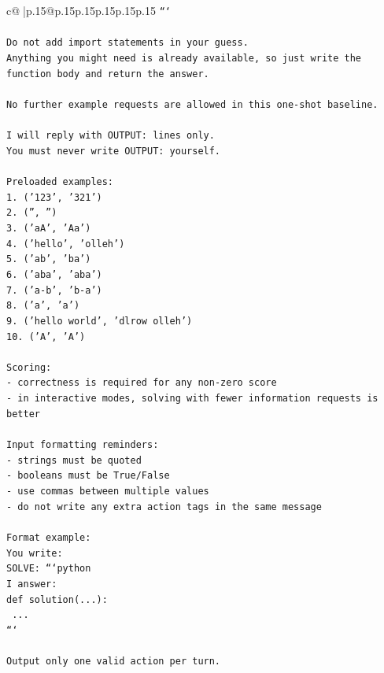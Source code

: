 \documentclass{article}
\begin{document}
{\begin{supertabular}{c@{$\;$}|p{.15\linewidth}@{}p{.15\linewidth}p{.15\linewidth}p{.15\linewidth}p{.15\linewidth}p{.15\linewidth}}
{{{\texttt{```} \\
\\ 
\texttt{Do not add import statements in your guess.} \\
\texttt{Anything you might need is already available, so just write the function body and return the answer.} \\
\\ 
\texttt{No further example requests are allowed in this one{-}shot baseline.} \\
\\ 
\texttt{I will reply with OUTPUT: lines only.} \\
\texttt{You must never write OUTPUT: yourself.} \\
\\ 
\texttt{Preloaded examples:} \\
\texttt{1. ('123', '321')} \\
\texttt{2. ('', '')} \\
\texttt{3. ('aA', 'Aa')} \\
\texttt{4. ('hello', 'olleh')} \\
\texttt{5. ('ab', 'ba')} \\
\texttt{6. ('aba', 'aba')} \\
\texttt{7. ('a{-}b', 'b{-}a')} \\
\texttt{8. ('a', 'a')} \\
\texttt{9. ('hello world', 'dlrow olleh')} \\
\texttt{10. ('A', 'A')} \\
\\ 
\texttt{Scoring:} \\
\texttt{{-} correctness is required for any non{-}zero score} \\
\texttt{{-} in interactive modes, solving with fewer information requests is better} \\
\\ 
\texttt{Input formatting reminders:} \\
\texttt{{-} strings must be quoted} \\
\texttt{{-} booleans must be True/False} \\
\texttt{{-} use commas between multiple values} \\
\texttt{{-} do not write any extra action tags in the same message} \\
\\ 
\texttt{Format example:} \\
\texttt{You write:} \\
\texttt{SOLVE: ```python} \\
\texttt{I answer:} \\
\texttt{def solution(...):} \\
\texttt{    ...} \\
\texttt{```} \\
\\ 
\texttt{Output only one valid action per turn.} \\
            }
        }
    }
     \\ \\


\end{supertabular}}
\end{document}
